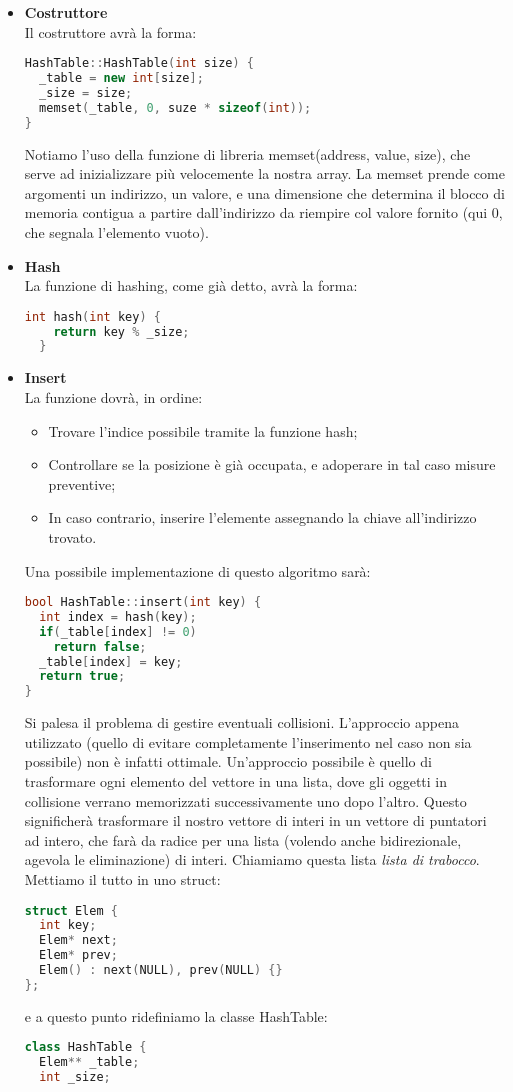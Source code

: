 \documentclass[a4paper,12pt]{article}
\begin{document}
\begin{itemize}
  \item \textbf{Costruttore} \\
Il costruttore avrà la forma:
\begin{lstlisting}[language=C++]
HashTable::HashTable(int size) {
  _table = new int[size];
  _size = size;
  memset(_table, 0, suze * sizeof(int));
}
\end{lstlisting}
Notiamo l'uso della funzione di libreria memset(address, value, size), che serve ad inizializzare più velocemente la nostra array.
La memset prende come argomenti un indirizzo, un valore, e una dimensione che determina il blocco di memoria contigua a partire dall'indirizzo
da riempire col valore fornito (qui 0, che segnala l'elemento vuoto).
\item \textbf{Hash} \\
  La funzione di hashing, come già detto, avrà la forma:
  \begin{lstlisting}[language=C++]
  int hash(int key) {
    return key % _size;
  }
  \end{lstlisting}
\item \textbf{Insert} \\
La funzione dovrà, in ordine:
\begin{itemize}
  \item Trovare l'indice possibile tramite la funzione hash;
  \item Controllare se la posizione è già occupata, e adoperare in tal caso misure preventive;
  \item In caso contrario, inserire l'elemente assegnando la chiave all'indirizzo trovato.
\end{itemize}
Una possibile implementazione di questo algoritmo sarà:
\begin{lstlisting}[language=C++]
bool HashTable::insert(int key) {
  int index = hash(key);
  if(_table[index] != 0) 
    return false;
  _table[index] = key;
  return true;
}
\end{lstlisting}
Si palesa il problema di gestire eventuali collisioni. L'approccio appena utilizzato (quello di evitare completamente
l'inserimento nel caso non sia possibile) non è infatti ottimale. Un'approccio possibile è quello di trasformare ogni elemento
del vettore in una lista, dove gli oggetti in collisione verrano memorizzati successivamente uno dopo l'altro. Questo significherà
trasformare il nostro vettore di interi in un vettore di puntatori ad intero, che farà da radice per una lista (volendo anche bidirezionale, agevola
le eliminazione) di interi. Chiamiamo questa lista \textit{lista di trabocco}. Mettiamo il tutto in uno struct:
\begin{lstlisting}[language=C++]
struct Elem {
  int key;
  Elem* next;
  Elem* prev;
  Elem() : next(NULL), prev(NULL) {}
};
\end{lstlisting}
e a questo punto ridefiniamo la classe HashTable:
\begin{lstlisting}[language=C++]
class HashTable {
  Elem** _table;
  int _size;


\end{lstlisting}
\end{itemize}
\end{document}
